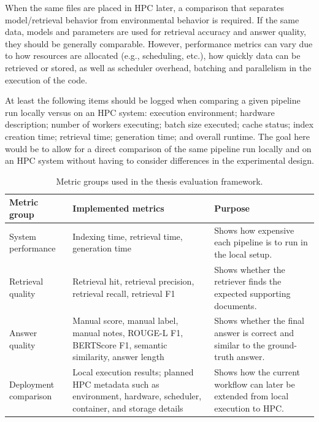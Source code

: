 When the same files are placed in HPC later, a comparison that separates model/retrieval behavior from environmental behavior is required. If the same data, models and parameters are used for retrieval accuracy and answer quality, they should be generally comparable. However, performance metrics can vary due to how resources are allocated (e.g., scheduling, etc.), how quickly data can be retrieved or stored, as well as scheduler overhead, batching and parallelism in the execution of the code.

At least the following items should be logged when comparing a given pipeline run locally versus on an HPC system: execution environment; hardware description; number of workers executing; batch size executed; cache status; index creation time; retrieval time; generation time; and overall runtime. The goal here would be to allow for a direct comparison of the same pipeline run locally and on an HPC system without having to consider differences in the experimental design.

\begin{table}[H]
\caption{Metric groups used in the thesis evaluation framework.}
\label{tab:evaluation-metric-groups}
\centering
\small
\begin{tabularx}{\textwidth}{>{\raggedright\arraybackslash}p{}>{\raggedright\arraybackslash}X>{\raggedright\arraybackslash}p{}}
\toprule
\textbf{Metric group} & \textbf{Implemented metrics} & \textbf{Purpose} \\
\midrule
System performance & Indexing time, retrieval time, generation time & Shows how expensive each pipeline is to run in the local setup. \\
Retrieval quality & Retrieval hit, retrieval precision, retrieval recall, retrieval F1 & Shows whether the retriever finds the expected supporting documents. \\
Answer quality & Manual score, manual label, manual notes, ROUGE-L F1, BERTScore F1, semantic similarity, answer length & Shows whether the final answer is correct and similar to the ground-truth answer. \\
Deployment comparison & Local execution results; planned \ac{HPC} metadata such as environment, hardware, scheduler, container, and storage details & Shows how the current workflow can later be extended from local execution to \ac{HPC}. \\
\bottomrule
\end{tabularx}
\end{table}


